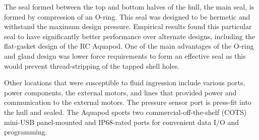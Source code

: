 The seal formed between the top and bottom halves of the hull, the main seal, is formed by compression of an O-ring. This seal was designed to be hermetic and withstand the maximum design pressure. Empirical results found this particular seal to have significantly better performance over alternate designs, including the flat-gasket design of the RC Aquapod. One of the main advantages of the O-ring and gland design was lower force requirements to form an effective seal as this would prevent thread-stripping of the tapped shell holes. 
	 


Other locations that were susceptible to fluid ingression include various ports, power components, the external motors, and lines that provided power and communication to the external motors. The pressure sensor port is press-fit into the hull and sealed. The Aquapod sports two commercial-off-the-shelf (COTS) mini-USB panel-mounted and IP68-rated ports for convenient data I/O and programming. %


